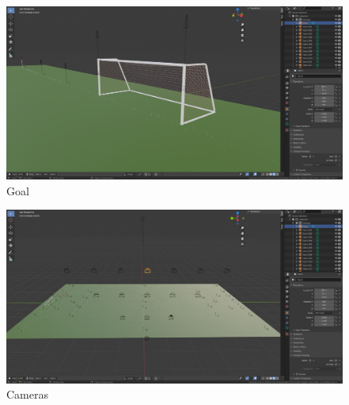 \documentclass[
    11pt,
    oneside
]{report}
\begin{document}
\begin{appendices}
\begin{figure}[H]
    \includegraphics[keepaspectratio, width=\columnwidth]{Screenshot_2022-03-05_12-47-42.png}
    \caption{Goal}
    \label{img:goal}
\end{figure}

\begin{figure}[H]
    \includegraphics[keepaspectratio, width=\columnwidth]{Screenshot_2022-03-05_12-05-23.png}
    \caption{Cameras}
    \label{img:cameras}
\end{figure}





\end{appendices}
\end{document}
